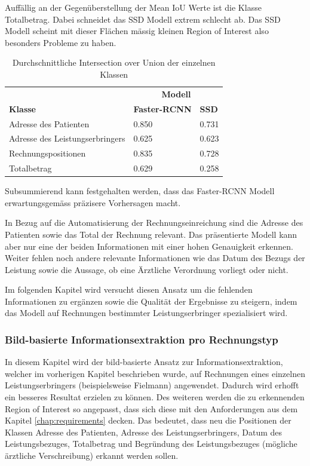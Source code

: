 Auffällig an der Gegenüberstellung der Mean IoU Werte ist die Klasse Totalbetrag. Dabei schneidet das SSD Modell extrem schlecht ab. Das SSD Modell scheint mit dieser Flächen mässig kleinen Region of Interest also besonders Probleme zu haben.

\begin{table}[h!]
\label{tab:3ap-iou}
\centering
    \captionsetup{width=.9\linewidth}
    \caption{Durchschnittliche Intersection over Union der einzelnen Klassen}
    \begin{tabular}{lll}
                                    & \multicolumn{2}{c}{\textbf{Modell}}  \\
    \textbf{Klasse}                          & \textbf{Faster-RCNN} & \textbf{SSD}           \\
    Adresse des Patienten           & 0.850       & 0.731         \\
    Adresse des Leistungserbringers & 0.625       & 0.623         \\
    Rechnungspositionen             & 0.835       & 0.728         \\
    Totalbetrag                     & 0.629       & 0.258             
    \end{tabular}
\end{table}

Subsummierend kann festgehalten werden, dass das Faster-RCNN Modell erwartungsgemäss präzisere Vorhersagen macht. 

In Bezug auf die Automatisierung der Rechnungseinreichung sind die Adresse des Patienten sowie das Total der Rechnung relevant. Das präsentierte Modell kann aber nur eine der beiden Informationen mit einer hohen Genauigkeit erkennen. Weiter fehlen noch andere relevante Informationen wie das Datum des Bezugs der Leistung sowie die Aussage, ob eine Ärztliche Verordnung vorliegt oder nicht. 

Im folgenden Kapitel wird versucht diesen Ansatz um die fehlenden Informationen zu ergänzen sowie die Qualität der Ergebnisse zu steigern, indem das Modell auf Rechnungen bestimmter Leistungserbringer spezialisiert wird.


\subsubsection{Bild-basierte Informationsextraktion pro Rechnungstyp}
In diesem Kapitel wird der bild-basierte Ansatz zur Informationsextraktion, welcher im vorherigen Kapitel beschrieben wurde, auf Rechnungen eines einzelnen Leistungserbringers (beispielsweise Fielmann) angewendet. Dadurch wird erhofft ein besseres Resultat erzielen zu können. Des weiteren werden die zu erkennenden Region of Interest so angepasst, dass sich diese mit den Anforderungen aus dem Kapitel \ref{chap:requirements} decken. Das bedeutet, dass neu die Positionen der Klassen Adresse des Patienten, Adresse des Leistungserbringers, Datum des Leistungsbezuges, Totalbetrag und Begründung des Leistungsbezuges (mögliche ärztliche Verschreibung) erkannt werden sollen.


